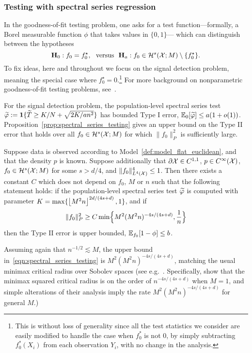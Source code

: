 \subsubsection{Testing with spectral series regression}
In the goodness-of-fit testing problem, one asks for a test function---formally, a Borel measurable function $\phi$ that takes values in $\{0,1\}$--- which can distinguish between the hypotheses
\begin{equation}
\mathbf{H}_0: f_0 = f_0^{\star}, ~~\textrm{versus}~~ \mathbf{H}_a: f_0 \in \mathcal{H}^{s}(\mathcal{X};M) \setminus \{f_0^{\star}\}.
\end{equation} 
To fix ideas, here and throughout we focus on the signal detection problem, meaning the special case where $f_0^{\star} = 0$.\footnote{This is without loss of generality since all the test statistics we consider are easily modified to handle the case when $f_0^{\ast}$ is not $0$, by simply subtracting $f_0^{\ast}(X_i)$ from each observation $Y_i$, with no change in the analysis.} For more background on nonparametric goodness-of-fit testing problems, see~\cite{ingster2012}.

For the signal detection problem, the population-level spectral series test $\widetilde{\varphi} := \mathbf{1}\{\widetilde{T} \geq K/N + \sqrt{2K/an^2}\}$ has bounded Type I error, $\mathbb{E}_{0}[\widetilde{\varphi}] \leq a (1 + o(1))$. Proposition~\ref{prop:spectral_series_testing} gives an upper bound on the Type II error that holds over all $f_0 \in \mathcal{H}^s(\mathcal{X};M)$ for which $\|f_0\|_P^2$ is sufficiently large.
\begin{proposition}
	\label{prop:spectral_series_testing}
	Suppose data is observed according to Model~\ref{def:model_flat_euclidean}, and that the density $p$ is known.  Suppose additionally that $\partial \mathcal{X} \in C^{1,1}$, $p \in C^{\infty}(\mathcal{X})$, $f_0 \in \mathcal{H}^{s}(\mathcal{X};M)$ for some $s > d/4$, and $\|f_0\|_{L^4(\mathcal{X})}^4 \leq 1$. Then there exists a constant $C$ which does not depend on $f_0$, $M$ or $n$ such that the following statement holds: if the population-level spectral series test $\widetilde{\varphi}$ is computed with parameter $K = \max\{\left\lfloor M^2n \right\rfloor^{2d/(4s + d)},1\}$, and if
	\begin{equation}
	\label{eqn:spectral_series_testing}
	\|f_0\|_P^2 \geq C\min\Bigl\{M^2(M^2n)^{-4s/(4s + d)}, \frac{1}{n}\Bigr\}
	\end{equation}
	then the Type II error is upper bounded, $\mathbb{E}_{f_0}[1 - \phi] \leq b$.
\end{proposition}
Assuming again that $n^{-1/2} \lesssim M$, the upper bound in~\eqref{eqn:spectral_series_testing} is $M^2(M^2n)^{-4s/(4s + d)}$, matching the usual minimax critical radius over Sobolev spaces (see e.g.~\cite{guerre02,ingster2009,ingster2012}. Specifically, \cite{ingster2009} show that the minimax squared critical radius is on the order of $n^{-4s/(4s + d)}$ when $M = 1$, and simple alterations of their analysis imply the rate $M^2(M^2n)^{-4s/(4s + d)}$ for general $M$.) 

